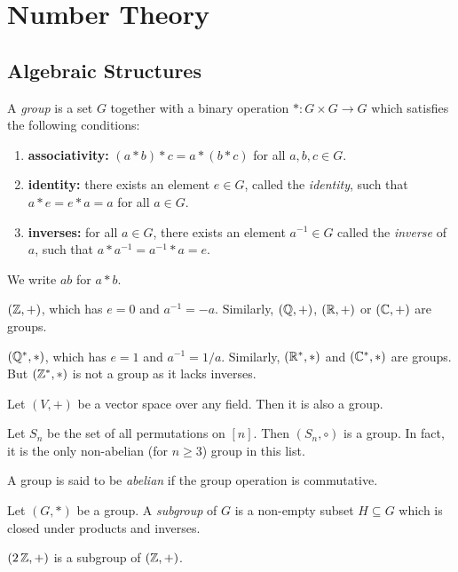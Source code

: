 \chapter{Number Theory} \label{chp:nt}

\section{Algebraic Structures} \label{sec:nt:algebraic_structures}
\begin{definition*}[Group] \label{def:group}
    A \emph{group} is a set $G$ together with a binary operation
    $*\colon G \times G \to G$ which satisfies the following conditions:
    \begin{enumerate}[label=\small(G\arabic*)]
        \item \textbf{associativity:}
            $(a * b) * c = a * (b * c)$ for all $a, b, c \in G$.
        \item \textbf{identity:}
            there exists an element $e \in G$, called the \emph{identity},
            such that $a * e = e * a = a$ for all $a \in G$.
        \item \textbf{inverses:}
            for all $a \in G$, there exists an element $a^{-1} \in G$
            called the \emph{inverse} of $a$, such that
            $a * a^{-1} = a^{-1} * a = e$.
    \end{enumerate}
\end{definition*}
\begin{notation}
    We write $ab$ for $a * b$.
\end{notation}
\begin{examples}
    \item $(\mathbb{Z}, +)$, which has $e = 0$ and $a^{-1} = -a$.
    Similarly, $(\mathbb{Q}, +)$, $(\mathbb{R}, +)$ or $(\mathbb{C}, +)$ are groups.
    \item $(\mathbb{Q}^*, *)$, which has $e = 1$
    and $a^{-1} = 1/a$.
    Similarly, $(\mathbb{R}^*, *)$ and $(\mathbb{C}^*, *)$ are groups.
    But $(\mathbb{Z}^*, *)$ is not a group as it lacks inverses.
    \item Let $(V, +)$ be a vector space over any field.
    Then it is also a group.
    \item Let $S_n$ be the set of all permutations on $[n]$.
    Then $(S_n, \circ)$ is a group.
    In fact, it is the only non-abelian (for $n \ge 3$) group in this list.
\end{examples}
\begin{definition} \label{def:group:abelian}
    A group is said to be \emph{abelian} if the group operation is
    commutative.
\end{definition}
\begin{definition}[Subgroup] \label{def:group:sub}
    Let $(G, *)$ be a group.
    A \emph{subgroup} of $G$ is a non-empty subset $H \subseteq G$ which
    is closed under products and inverses.
\end{definition}
\begin{example}
    $(2\,\mathbb{Z}, +)$ is a subgroup of $(\mathbb{Z}, +)$.
\end{example}

